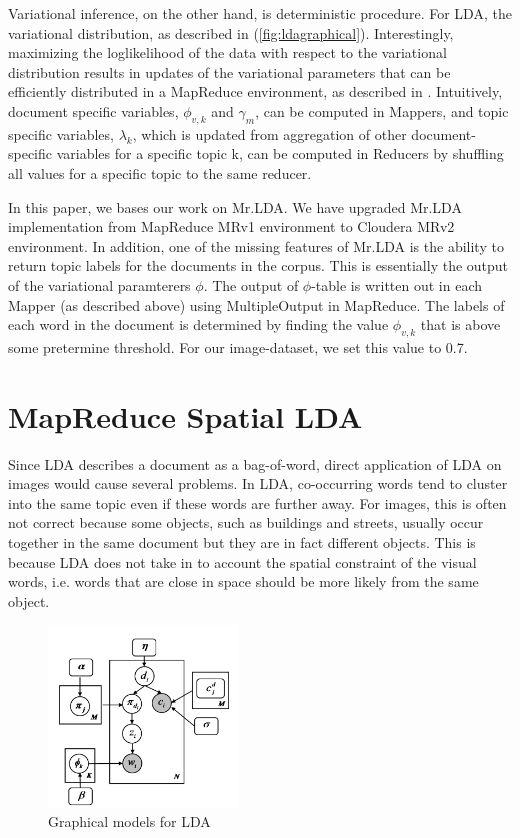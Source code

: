 \documentclass{acm_proc_article-sp}
\begin{document}
Variational inference, on the other hand, is deterministic procedure. For LDA, the variational distribution, as described in (\ref{fig:ldagraphical}). Interestingly, maximizing the loglikelihood of the data with respect to the variational distribution results in updates of the variational parameters that can be efficiently distributed in a MapReduce environment, as described in \cite{mrlda}. Intuitively, document specific variables, $\phi_{v,k}$ and $\gamma_m$, can be computed in Mappers, and topic specific variables, $\lambda_k$, which is updated from aggregation of other document-specific variables for a specific topic k, can be computed in Reducers by shuffling all values for a specific topic to the same reducer.

In this paper, we bases our work on Mr.LDA. We have upgraded Mr.LDA implementation from MapReduce MRv1 environment to Cloudera MRv2 environment. In addition, one of the missing features of Mr.LDA is the ability to return topic labels for the documents in the corpus. This is essentially the output of the variational paramterers $\phi$. The output of $\phi$-table is written out in each Mapper (as described above) using MultipleOutput in MapReduce. The labels of each word in the document is determined by finding the value $\phi_{v,k}$ that is above some pretermine threshold. For our image-dataset, we set this value to 0.7.

\section{MapReduce Spatial LDA}

Since LDA describes a document as a bag-of-word, direct application of LDA on images would cause several problems. In LDA, co-occurring words tend to cluster into the same topic even if these words are further away. For images, this is often 	not correct because some objects, such as buildings and streets, usually occur together in the same document but they are in fact different objects. This is because LDA does not take in to account the spatial constraint of the visual words, i.e. words that are close in space should be more likely from the same object.
\begin{figure}[!htb]
 \centering
 \includegraphics[width=0.45\textwidth]{fig/eqn/slda-variational}
 \caption{Graphical models for LDA}\label{fig:sldagraphical}
\end{figure}
\end{document}
